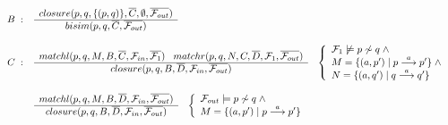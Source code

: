 \begin{figure}
\begingroup\tiny%
\[
\begin{array}{r@{\;\;}c@{\;\;\;\;}l}
B & : &
\myfrac{closure(p,q,\{(p,q)\},\overline{C},\emptyset,\overline{{\cal F}_{out}})}{bisim(p,q,\overline{C},\overline{{\cal F}_{out}})}\\
\\[.5\baselineskip]

C & : &
\myfrac{matchl(p,q,M,B,\overline{C},{\cal F}_{in},\overline{{\cal F}_{1}})\;\;\;matchr(p,q,N,C,\overline{D},{\cal F}_{1},\overline{{\cal F}_{out}})}{closure(p,q,B,\overline{D},{\cal F}_{in},\overline{{\cal F}_{out}})}
\;\;\;\left\{
\begin{array}{l}
{\cal F}_1\not\models p\not\sim q\;\wedge\\
M=\{(a,p')\mid p\der{a}p'\}\;\wedge\\
N=\{(a,q')\mid q\der{a}q'\}
\end{array}
\right.\\
\\[.5\baselineskip]
& &
\myfrac{matchl(p,q,M,B,\overline{D},{\cal F}_{in},\overline{{\cal F}_{out}})}{closure(p,q,B,\overline{D},{\cal F}_{in},\overline{{\cal F}_{out}})}
\;\;\;\left\{
\begin{array}{l}
{\cal F}_{out}\models p\not\sim q\;\wedge\\
M=\{(a,p')\mid p\der{a}p'\}
\end{array}
\right.\\
\\[.5\baselineskip]


\end{array}\]
\end{figure}
